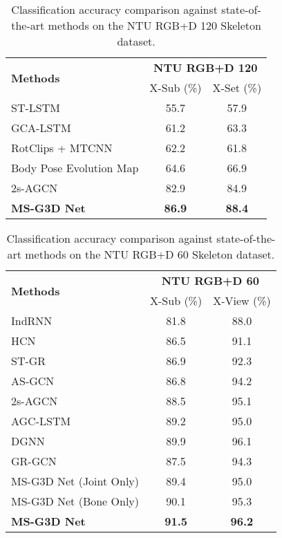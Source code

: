\documentclass[10pt,twocolumn,letterpaper]{article}
\begin{document}
\begin{table}[t]
\centering
\begin{tabular}{lcc}
\hline
\multirow{2}{*}{\textbf{Methods}} & \multicolumn{2}{c}{\textbf{NTU RGB+D 120}} \\
 & X-Sub (\%) & X-Set (\%) \\
\hline
\hline
ST-LSTM \cite{st-lstm-trust-gates-skeleton-eccv2016} & 55.7 & 57.9 \\
GCA-LSTM \cite{two-stream-attention-lstm-ntu120} & 61.2 & 63.3 \\
RotClips + MTCNN \cite{rotclips-ntu120} & 62.2 & 61.8 \\
Body Pose Evolution Map \cite{body-pose-evolution-map-ntu-120} & 64.6 & 66.9 \\
\hline
2s-AGCN \cite{2s-AGCN} & 82.9 & 84.9 \\ \hline
\textbf{MS-G3D Net} & \textbf{86.9} & \textbf{88.4} \\
\hline
\end{tabular}
\caption{Classification accuracy comparison against state-of-the-art methods on the NTU RGB+D 120 Skeleton dataset.
}
\label{tab:ntu-120-results}
\vspace{-0mm}\end{table}

\begin{table}[t]
\centering
\begin{tabular}{lcc}
\hline
\multirow{2}{*}{\textbf{Methods}} & \multicolumn{2}{c}{\textbf{NTU RGB+D 60}} \\
 & X-Sub (\%) & X-View (\%) \\
\hline
\hline
IndRNN \cite{indrnn-skeleton} & 81.8 & 88.0 \\
HCN \cite{li2018co-human-skeleton-ijcai18} & 86.5 & 91.1 \\
\hline
ST-GR \cite{st-graph-routing-skeleton-aaai19} & 86.9 & 92.3 \\
AS-GCN \cite{AS-GCN-skeleton-cvpr19} & 86.8 & 94.2 \\
2s-AGCN \cite{2s-AGCN} & 88.5 & 95.1 \\
AGC-LSTM \cite{attention-gcn-lstm-cvpr2019} & 89.2 & 95.0 \\
DGNN \cite{dgnn} & 89.9 & 96.1 \\
\hline
GR-GCN \cite{GR-GCN} & 87.5 & 94.3 \\
\hline
MS-G3D Net (Joint Only) & 89.4 & 95.0 \\
MS-G3D Net (Bone Only) & 90.1 & 95.3 \\
\textbf{MS-G3D Net} & \textbf{91.5} & \textbf{96.2} \\
\hline
\end{tabular}
\caption{Classification accuracy comparison against state-of-the-art methods on the NTU RGB+D 60 Skeleton dataset.}
\label{tab:ntu-60-results}
\vspace{-0mm}\end{table}
\end{document}
